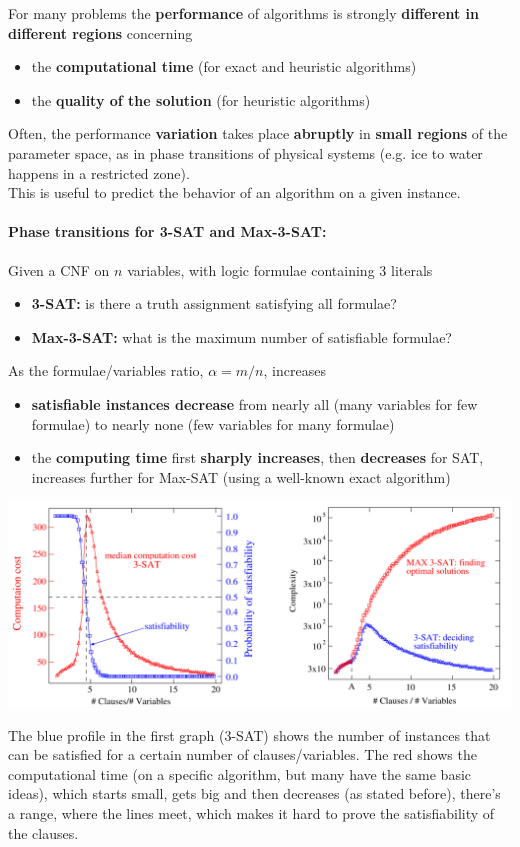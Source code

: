 For many problems the \textbf{performance} of algorithms is strongly \textbf{different in different regions} concerning
\begin{itemize}
	\item the \textbf{computational time} (for exact and heuristic algorithms)
	\item the \textbf{quality of the solution} (for heuristic algorithms)
\end{itemize}
Often, the performance \textbf{variation} takes place \textbf{abruptly} in \textbf{small regions} of the parameter space, as in phase transitions of physical systems (e.g. ice to water happens in a restricted zone).\\
This is useful to predict the behavior of an algorithm on a given instance.\\

\newpage

\paragraph{Phase transitions for 3-SAT and Max-3-SAT:} Given a CNF on $n$ variables, with logic formulae containing $3$ literals
\begin{itemize}
	\item \textbf{3-SAT:} is there a truth assignment satisfying all formulae?
	\item \textbf{Max-3-SAT:} what is the maximum number of satisfiable formulae?
\end{itemize}
As the formulae/variables ratio, $\alpha = m/n$, increases
\begin{itemize}
	\item \textbf{satisfiable instances decrease} from nearly all (many variables for few formulae) to nearly none (few variables for many formulae)
	\item the \textbf{computing time} first \textbf{sharply increases}, then \textbf{decreases} for SAT, increases further for Max-SAT (using a well-known exact algorithm)
\end{itemize}
\begin{center}
	\includegraphics[width=\columnwidth]{img/PhaseT1}
\end{center}
The blue profile in the first graph (3-SAT) shows the number of instances that can be satisfied for a certain number of clauses/variables. The red shows the computational time (on a specific algorithm, but many have the same basic ideas), which starts small, gets big and then decreases (as stated before), there's a range, where the lines meet, which makes it hard to prove the satisfiability of the clauses.\\

